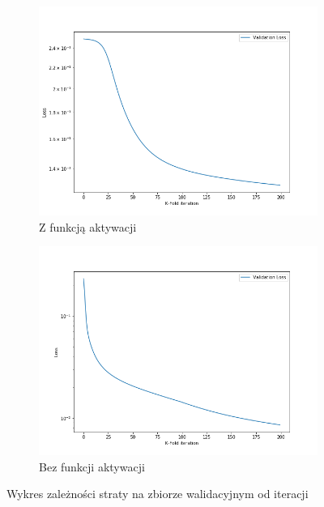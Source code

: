 \documentclass[12pt,a4paper]{article}
\begin{document}
\begin{figure}[h]
  \centering
\begin{subfigure}{0.5\textwidth}
  \includegraphics[width=\linewidth]{charts/activ_vs_noactiv/activ_extr.png}
  \caption{Z funkcją aktywacji}
  \label{}
\end{subfigure}\hfil
\begin{subfigure}{0.5\textwidth}
  \includegraphics[width=\linewidth]{charts/activ_vs_noactiv/noactiv_extr.png}
  \caption{Bez funkcji aktywacji}
  \label{}
\end{subfigure}
\caption{Wykres zależności straty na zbiorze walidacyjnym od iteracji}
\label{}
\end{figure}
\end{document}
